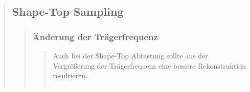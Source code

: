\begin{quote}
\begin{quote}
\begin{quote}
             
        \end{quote}
    
    \end{quote}
    
    \subsection{Shape-Top Sampling}
    \begin{quote}
        
        
        \subsubsection{Änderung der Trägerfrequenz}
        \begin{quote}
            
            Auch bei der Shape-Top Abtastung sollte aus der Vergrößerung der Trägerfrequenz eine bessere
            Rekonstruktion resultieren.
            
            \begin{center}
            \begin{tabular}{ll}
            

\end{tabular}
\end{center}
\end{quote}
\end{quote}
\end{quote}
